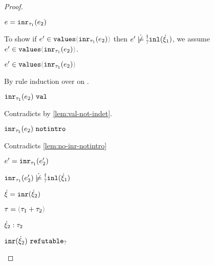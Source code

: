 \begin{proof}
\begin{byCases}
\begin{byCases}
\begin{byCases}
\begin{pfsteps*}
          \item $e=\mathtt{inr}_{\tau_1}({e_2})$ 
          \end{pfsteps*}
          To show if $\inValues{e'}{\hinr{\tau_1}{e_2}}$ then $\cnotsatisfyormay{e'}{\cinl{\hxi_1}}$, we assume $\inValues{e'}{\hinr{\tau_1}{e_2}}$.
          \begin{pfsteps*}
          \item $\inValues{e'}{\hinr{\tau_1}{e_2}}$  
          \end{pfsteps*}
          By rule induction over  on .
          \begin{byCases}
            \item[\text{(\ref{rule:IVVal})}]
            \begin{pfsteps*}
            \item $\mathtt{inr}_{\tau_1}({e_2}) ~\mathtt{val}$ 
            \end{pfsteps*} 
            Contradicts  by \autoref{lem:val-not-indet}.
            \item[\text{(\ref{rule:IVIndet})}] 
            \begin{pfsteps*}
            \item $\mathtt{inr}_{\tau_1}({e_2}) ~\mathtt{notintro}$ 
            \end{pfsteps*} 
            Contradicts \autoref{lem:no-inr-notintro}
            \item[\text{(\ref{rule:IVInr})}] 
            \begin{pfsteps*}
            \item $e'=\mathtt{inr}_{\tau_1}({e_2'})$ 
            \item $\cnotsatisfyormay{\hinr{\tau_1}{e_2'}}{\cinl{\hxi_1}}$ 
            \end{pfsteps*} 
          \end{byCases}
        \end{byCases} 
      \end{byCases}
    \item[\text{(\ref{rule:CTInr})}]
    \begin{pfsteps*}
      \item $\dot{\xi} = \mathtt{inr}(\dot{\xi}_2)$ 
      \item $\tau = \tsum{\tau_1}{\tau_2}$ 
      \item $\dot{\xi}_2 : \tau_2$  
      \item $\mathtt{inr}(\dot{\xi}_2) ~\mathtt{refutable}_?$  
      \end{pfsteps*}


\end{byCases}
\end{proof}
